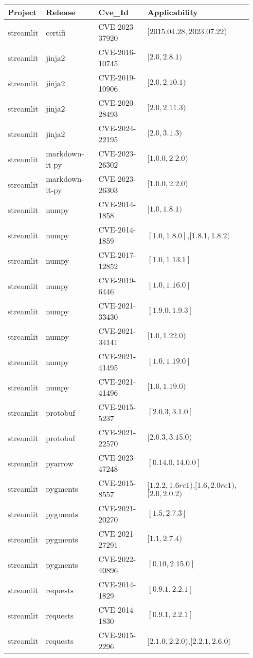 \begin{tabular}{llll}
\toprule
Project & Release & Cve_Id & Applicability \\
\midrule
streamlit & certifi & CVE-2023-37920 & $[2015.04.28,2023.07.22)$ \\
streamlit & jinja2 & CVE-2016-10745 & $[2.0,2.8.1)$ \\
streamlit & jinja2 & CVE-2019-10906 & $[2.0,2.10.1)$ \\
streamlit & jinja2 & CVE-2020-28493 & $[2.0,2.11.3)$ \\
streamlit & jinja2 & CVE-2024-22195 & $[2.0,3.1.3)$ \\
streamlit & markdown-it-py & CVE-2023-26302 & $[1.0.0,2.2.0)$ \\
streamlit & markdown-it-py & CVE-2023-26303 & $[1.0.0,2.2.0)$ \\
streamlit & numpy & CVE-2014-1858 & $[1.0,1.8.1)$ \\
streamlit & numpy & CVE-2014-1859 & $[1.0,1.8.0]$,$[1.8.1,1.8.2)$ \\
streamlit & numpy & CVE-2017-12852 & $[1.0,1.13.1]$ \\
streamlit & numpy & CVE-2019-6446 & $[1.0,1.16.0]$ \\
streamlit & numpy & CVE-2021-33430 & $[1.9.0,1.9.3]$ \\
streamlit & numpy & CVE-2021-34141 & $[1.0,1.22.0)$ \\
streamlit & numpy & CVE-2021-41495 & $[1.0,1.19.0]$ \\
streamlit & numpy & CVE-2021-41496 & $[1.0,1.19.0)$ \\
streamlit & protobuf & CVE-2015-5237 & $[2.0.3,3.1.0]$ \\
streamlit & protobuf & CVE-2021-22570 & $[2.0.3,3.15.0)$ \\
streamlit & pyarrow & CVE-2023-47248 & $[0.14.0,14.0.0]$ \\
streamlit & pygments & CVE-2015-8557 & $[1.2.2,1.6rc1)$,$[1.6,2.0rc1)$,$[2.0,2.0.2)$ \\
streamlit & pygments & CVE-2021-20270 & $[1.5,2.7.3]$ \\
streamlit & pygments & CVE-2021-27291 & $[1.1,2.7.4)$ \\
streamlit & pygments & CVE-2022-40896 & $[0.10,2.15.0]$ \\
streamlit & requests & CVE-2014-1829 & $[0.9.1,2.2.1]$ \\
streamlit & requests & CVE-2014-1830 & $[0.9.1,2.2.1]$ \\
streamlit & requests & CVE-2015-2296 & $[2.1.0,2.2.0)$,$[2.2.1,2.6.0)$ \\

\end{tabular}
